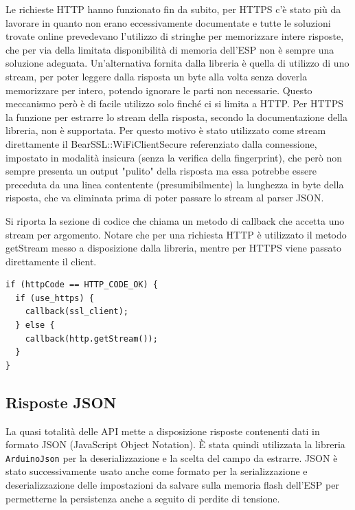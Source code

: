 \documentclass[12pt,a4paper]{report}
\begin{document}
Le richieste HTTP hanno funzionato fin da subito, per HTTPS c'è stato più da lavorare in quanto non erano eccessivamente
documentate e tutte le soluzioni trovate online prevedevano l'utilizzo di stringhe per memorizzare intere risposte, che per via
della limitata disponibilità di memoria dell'ESP non è sempre una soluzione adeguata.
Un'alternativa fornita dalla libreria è quella di utilizzo di uno stream, per poter leggere dalla risposta un byte alla volta senza doverla
memorizzare per intero, potendo ignorare le parti non necessarie. Questo meccanismo però è di facile utilizzo solo finché ci si limita a
HTTP. Per HTTPS la funzione per estrarre lo stream della risposta, secondo la documentazione della libreria, non è supportata.
Per questo motivo è stato utilizzato come stream direttamente il BearSSL::WiFiClientSecure referenziato dalla connessione, impostato in
modalità insicura (senza la verifica della fingerprint), che però non sempre presenta un output "pulito" della risposta ma essa potrebbe
essere preceduta da una linea contentente (presumibilmente) la lunghezza in byte della risposta, che va eliminata prima di poter
passare lo stream al parser JSON.

Si riporta la sezione di codice che chiama un metodo di callback che accetta uno stream per argomento. Notare che per una richiesta
HTTP è utilizzato il metodo getStream messo a disposizione dalla libreria, mentre per HTTPS viene passato direttamente il client.
\begin{lstlisting}
if (httpCode == HTTP_CODE_OK) {
  if (use_https) {
    callback(ssl_client);
  } else {
    callback(http.getStream());
  }
}
\end{lstlisting}

\subsection{Risposte JSON}
La quasi totalità delle API mette a disposizione risposte contenenti dati in formato JSON (JavaScript Object Notation). È stata quindi
utilizzata la libreria \texttt{ArduinoJson} per la deserializzazione e la scelta del campo da estrarre.
JSON è stato successivamente usato anche come formato per la serializzazione e deserializzazione delle impostazioni da salvare sulla
memoria flash dell'ESP per permetterne la persistenza anche a seguito di perdite di tensione.
\end{document}
